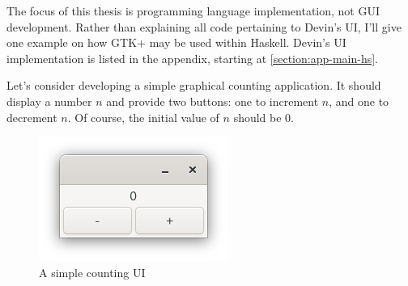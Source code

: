 \documentclass[UdineBachThesis,american,11pt]{PhdThesis}
\begin{document}
  The focus of this thesis is programming language implementation, not GUI
  development. Rather than explaining all code pertaining to Devin's UI, I'll
  give one example on how GTK+ may be used within Haskell. Devin's UI
  implementation is listed in the appendix, starting at
  \autoref{section:app-main-hs}.

  Let's consider developing a simple graphical counting application. It should
  display a number $n$ and provide two buttons: one to increment $n$, and one to
  decrement $n$. Of course, the initial value of $n$ should be $0$.

  \begin{figure}[h]
    \centering
    \includegraphics[scale=0.8]{7.png}
    \caption{A simple counting UI}
  \end{figure}

  \newpage
\end{document}
